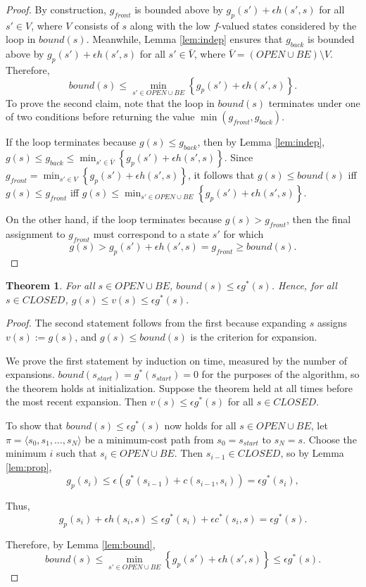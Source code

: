\documentclass[letterpaper]{article}
\newtheorem{thm}{Theorem}
\begin{document}
\begin{proof}
By construction, $g_{front}$ is bounded above by $g_p(s') + \epsilon h(s',s)$ for all $s'\in V$, where $V$ consists of $s$ along with the low $f$-valued states considered by the loop in $bound(s)$. Meanwhile, Lemma \ref{lem:indep} ensures that $g_{back}$ is bounded above by $g_p(s') + \epsilon h(s',s)$ for all $s'\in \bar V$, where $\bar V = (OPEN \cup BE) \setminus V$. Therefore,
\[bound(s) \le \min_{s' \in OPEN \cup BE} \left\{g_p(s') + \epsilon h(s',s)\right\}.\]
To prove the second claim, note that the loop in $bound(s)$ terminates under one of two conditions before returning the value $\min(g_{front},g_{back})$.

If the loop terminates because $g(s) \le g_{back}$, then by Lemma \ref{lem:indep}, $g(s) \le g_{back} \le \min_{s'\in \bar V} \left\{ g_p(s') + \epsilon h(s',s) \right\}$. Since $g_{front} = \min_{s'\in V} \left\{ g_p(s') + \epsilon h(s',s) \right\}$, it follows that $g(s) \le bound(s)$ iff $g(s) \le g_{front}$ iff $g(s) \le \min_{s'\in OPEN \cup BE} \left\{ g_p(s') + \epsilon h(s',s) \right\}$.

On the other hand, if the loop terminates because $g(s) > g_{front}$, then the final assignment to $g_{front}$ must correspond to a state $s'$ for which
\[g(s) > g_p(s') + \epsilon h(s',s) = g_{front} \ge bound(s).\]
\end{proof}

\begin{thm}
\label{thm:subopt}
For all $s\in OPEN\cup BE$, $bound(s) \le \epsilon g^*(s)$. Hence, for all $s\in CLOSED$, $g(s) \le v(s) \le \epsilon g^*(s)$.
\end{thm}

\begin{proof}
The second statement follows from the first because expanding $s$ assigns $v(s) := g(s)$, and $g(s) \le bound(s)$ is the criterion for expansion.

We prove the first statement by induction on time, measured by the number of expansions. $bound(s_{start}) = g^*(s_{start}) = 0$ for the purposes of the algorithm, so the theorem holds at initialization. Suppose the theorem held at all times before the most recent expansion. Then $v(s) \le \epsilon g^*(s)$ for all $s\in CLOSED$.

To show that $bound(s) \le \epsilon g^*(s)$ now holds for all $s\in OPEN\cup BE$, let $\pi = \langle s_0,s_1,\ldots,s_N \rangle$ be a minimum-cost path from $s_0 = s_{start}$ to $s_N = s$. Choose the minimum $i$ such that $s_i\in OPEN\cup BE$. Then $s_{i-1}\in CLOSED$, so by Lemma \ref{lem:prop},
\[ g_p(s_i) \le \epsilon (g^*(s_{i-1}) + c(s_{i-1},s_i)) = \epsilon g^*(s_i), \]

Thus,
\[g_p(s_i) + \epsilon h(s_i,s) \le \epsilon g^*(s_i) + \epsilon c^*(s_i,s) = \epsilon g^*(s).\]

Therefore, by Lemma \ref{lem:bound},
\[bound(s) \le \min_{s' \in OPEN \cup BE} \left\{g_p(s') + \epsilon h(s',s)\right\} \le \epsilon g^*(s).\]
\end{proof}
\end{document}
